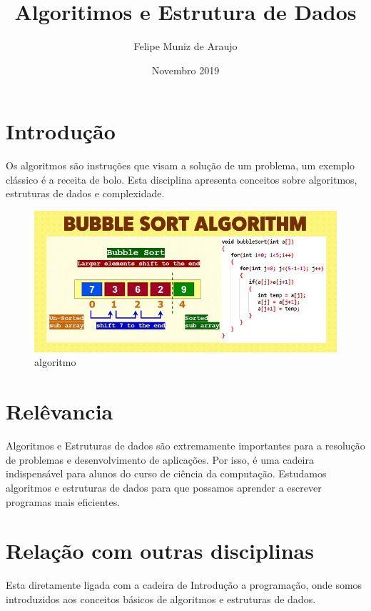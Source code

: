 \documentclass{article}
\title{Algoritimos e Estrutura de Dados}
\author{Felipe Muniz de Araujo}
\date{Novembro 2019}
\begin{document}
\maketitle

\section{Introdução}
Os algoritmos são instruções que visam a solução de um problema, um exemplo clássico é a receita de bolo. Esta disciplina apresenta conceitos sobre algoritmos, estruturas de dados e complexidade.\citep{site}

\begin{figure}[h!]
    \centering
    \includegraphics[scale=0.4]{download.jpg}
    \caption{algoritmo\citep{ef}}
    \label{fig:my_label}
\end{figure}

\section{Relêvancia}
Algoritmos e Estruturas de dados são extremamente importantes para a resolução de problemas e desenvolvimento de aplicações. Por isso, é uma cadeira indispensável para alunos do curso de ciência da computação. Estudamos algoritmos e estruturas de dados para que possamos aprender a escrever programas mais eficientes.\citep{cin}

\section{Relação com outras disciplinas} 
Esta diretamente ligada com a cadeira de Introdução a programação, onde somos introduzidos aos conceitos básicos de algoritmos e estruturas de dados.
 



\end{document}
